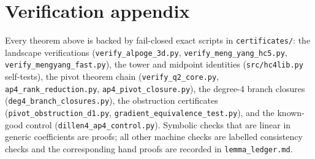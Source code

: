 \documentclass[11pt]{article}
\theoremstyle{plain}
\theoremstyle{definition}
\begin{document}
\section*{Verification appendix}
Every theorem above is backed by fail-closed exact scripts in
\texttt{certificates/}: the landscape verifications
(\texttt{verify\_alpoge\_3d.py}, \texttt{verify\_meng\_yang\_hc5.py},
\texttt{verify\_mengyang\_fast.py}), the tower and midpoint identities
(\texttt{src/hc4lib.py} self-tests), the pivot theorem chain
(\texttt{verify\_q2\_core.py}, \texttt{ap4\_rank\_reduction.py},
\texttt{ap4\_pivot\_closure.py}), the degree-4 branch closures
(\texttt{deg4\_branch\_closures.py}), the obstruction certificates
(\texttt{pivot\_obstruction\_d1.py},
\texttt{gradient\_equivalence\_test.py}), and the known-good control
(\texttt{dillen4\_ap4\_control.py}). Symbolic checks that are linear in
generic coefficients are proofs; all other machine checks are labelled
consistency checks and the corresponding hand proofs are recorded in
\texttt{lemma\_ledger.md}.
\end{document}
